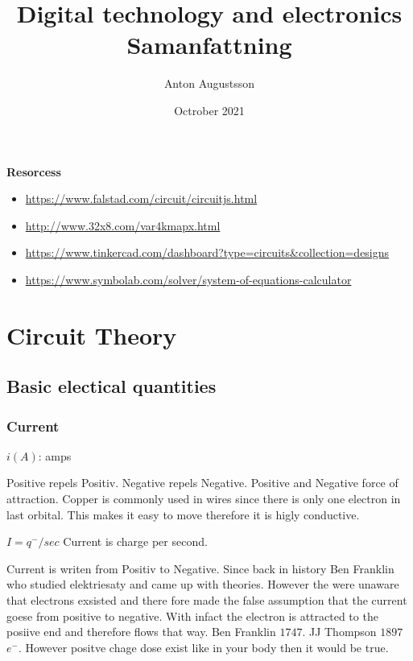 \documentclass{article}
\title{Digital technology and electronics Samanfattning}
\author{Anton Augustsson}
\date{Octrober 2021}
\begin{document}
\maketitle
\newpage
\tableofcontents
\newpage

\textbf{Resorcess}
\begin{itemize}
    \item \url{https://www.falstad.com/circuit/circuitjs.html}
    \item \url{http://www.32x8.com/var4kmapx.html}
    \item \url{https://www.tinkercad.com/dashboard?type=circuits&collection=designs}
    \item \url{https://www.symbolab.com/solver/system-of-equations-calculator}
\end{itemize}

\section{Circuit Theory}
\subsection{Basic electical quantities}
\subsubsection{Current}
$i (A)$: amps \newline

Positive repels Positiv. Negative repels Negative. Positive and Negative force of attraction.
Copper is commonly used in wires since there is only one electron in last orbital. This makes it easy
to move therefore it is higly conductive. \newline

$I = q^{-} / sec$ Current is charge per second. \newline

Current is writen from Positiv to Negative. Since back in history Ben Franklin who studied elektriesaty and
came up with theories. However the were unaware that electrons exsisted and there fore made the false
assumption that the current goese from positive to negative. With infact the electron is attracted to
the posiive end and therefore flows that way.
Ben Franklin $1747$.
JJ Thompson $1897$ $e^{-}$.
However positve chage dose exist like in your body then it would be true. \newline
\end{document}
